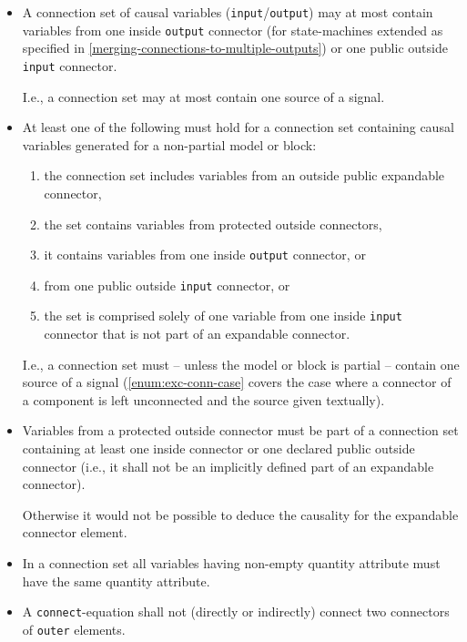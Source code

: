 \begin{itemize}
\item
  A connection set of causal variables (\lstinline!input!/\lstinline!output!) may at most contain variables from one inside \lstinline!output! connector (for state-machines extended as specified in \cref{merging-connections-to-multiple-outputs}) or one public outside \lstinline!input! connector.
  \begin{nonnormative}
  I.e., a connection set may at most contain one source of a signal.
  \end{nonnormative}
\item
  At least one of the following must hold for a connection set containing causal variables generated for a non-partial model or block:
\begin{enumerate}
\item
  the connection set includes variables from an outside public expandable connector,
\item
  the set contains variables from protected outside connectors,
\item
  it contains variables from one inside \lstinline!output! connector, or
\item
  from one public outside \lstinline!input! connector, or
\item\label{enum:exc-conn-case}%
  the  set is comprised solely of one variable from one inside \lstinline!input! connector that is not part of an expandable connector.
\end{enumerate}
\begin{nonnormative}
I.e., a connection set must -- unless the model or block is partial -- contain one source of a signal (\cref{enum:exc-conn-case} covers the case where a connector of a component is left unconnected and the source given textually).
\end{nonnormative}
\item
  Variables from a protected outside connector must be part of a connection set containing at least one inside connector or one declared public outside connector (i.e., it shall not be an implicitly defined part of an expandable connector).
  \begin{nonnormative}
  Otherwise it would not be possible to deduce the causality for the expandable connector element.
  \end{nonnormative}
\item
  In a connection set all variables having non-empty quantity attribute must have the same quantity attribute.
\item
  A \lstinline!connect!-equation shall not (directly or indirectly) connect two connectors of \lstinline!outer! elements.

\end{itemize}

